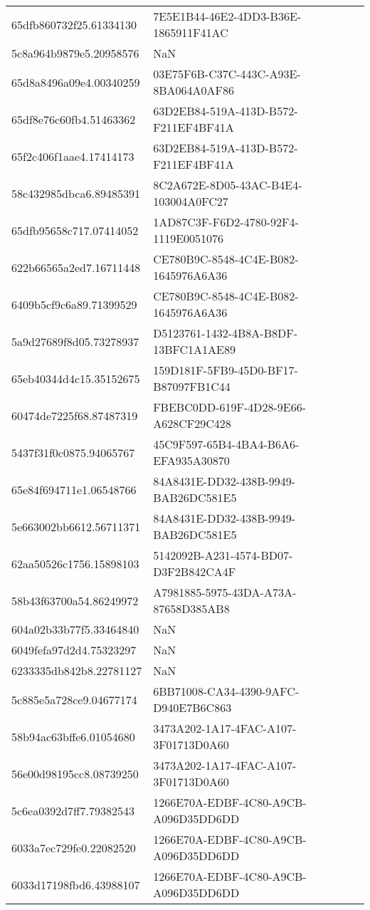 \begin{tabular}{ll}
65dfb860732f25.61334130 & 7E5E1B44-46E2-4DD3-B36E-1865911F41AC \\
5c8a964b9879e5.20958576 & NaN \\
65d8a8496a09e4.00340259 & 03E75F6B-C37C-443C-A93E-8BA064A0AF86 \\
65df8e76c60fb4.51463362 & 63D2EB84-519A-413D-B572-F211EF4BF41A \\
65f2c406f1aae4.17414173 & 63D2EB84-519A-413D-B572-F211EF4BF41A \\
58c432985dbca6.89485391 & 8C2A672E-8D05-43AC-B4E4-103004A0FC27 \\
65dfb95658c717.07414052 & 1AD87C3F-F6D2-4780-92F4-1119E0051076 \\
622b66565a2ed7.16711448 & CE780B9C-8548-4C4E-B082-1645976A6A36 \\
6409b5cf9c6a89.71399529 & CE780B9C-8548-4C4E-B082-1645976A6A36 \\
5a9d27689f8d05.73278937 & D5123761-1432-4B8A-B8DF-13BFC1A1AE89 \\
65eb40344d4c15.35152675 & 159D181F-5FB9-45D0-BF17-B87097FB1C44 \\
60474de7225f68.87487319 & FBEBC0DD-619F-4D28-9E66-A628CF29C428 \\
5437f31f0c0875.94065767 & 45C9F597-65B4-4BA4-B6A6-EFA935A30870 \\
65e84f694711e1.06548766 & 84A8431E-DD32-438B-9949-BAB26DC581E5 \\
5e663002bb6612.56711371 & 84A8431E-DD32-438B-9949-BAB26DC581E5 \\
62aa50526c1756.15898103 & 5142092B-A231-4574-BD07-D3F2B842CA4F \\
58b43f63700a54.86249972 & A7981885-5975-43DA-A73A-87658D385AB8 \\
604a02b33b77f5.33464840 & NaN \\
6049fefa97d2d4.75323297 & NaN \\
6233335db842b8.22781127 & NaN \\
5c885e5a728ce9.04677174 & 6BB71008-CA34-4390-9AFC-D940E7B6C863 \\
58b94ac63bffe6.01054680 & 3473A202-1A17-4FAC-A107-3F01713D0A60 \\
56e00d98195cc8.08739250 & 3473A202-1A17-4FAC-A107-3F01713D0A60 \\
5c6ea0392d7ff7.79382543 & 1266E70A-EDBF-4C80-A9CB-A096D35DD6DD \\
6033a7ec729fe0.22082520 & 1266E70A-EDBF-4C80-A9CB-A096D35DD6DD \\
6033d17198fbd6.43988107 & 1266E70A-EDBF-4C80-A9CB-A096D35DD6DD \\

\end{tabular}
